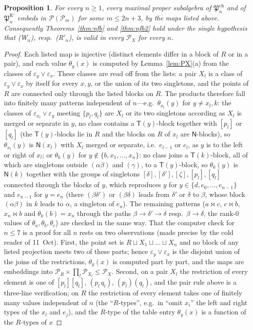 \documentclass[11pt]{amsart}
\newtheorem{proposition}[theorem]{Proposition}
\theoremstyle{definition}
\renewcommand{\P}{\mathcal{P}}
\newcommand{\T}{\mathsf{T}}
\newcommand{\N}{\mathsf{N}}
\newcommand{\mt}{\bowtie}   %
\begin{document}
\begin{proposition}\label{prop:maxsub}
For every $n\ge1$, every maximal proper subalgebra of $\mathfrak P^{\mathrm{ch}}_n$ and of $\mathfrak P^{\mathrm R'}_n$ embeds in $\P(\P_m)$ for some $m\le2n+3$, by the maps listed above. Consequently Theorems~\ref{thm:nfb} and \ref{thm:nfb2} hold under the single hypothesis that \textup{(W$_n$)}, resp.\ \textup{(R$'_n$)}, is valid in every $\P_X$ for every $n$.
\end{proposition}

\begin{proof}
Each listed map is injective (distinct elements differ in a block of $R$ or in a pair), and each value $\theta_y(x)$ is computed by Lemma~\ref{lem:PX}(a) from the classes of $\varepsilon_y\vee\varepsilon_x$. These classes are read off from the lists: a pair $X_l$ is a class of $\varepsilon_y\vee\varepsilon_x$ by itself for every $x,y$, or the union of its two singletons, and the points of $R$ are connected only through the listed blocks on $R$. The products therefore fall into finitely many patterns independent of $n$---e.g.\ $\theta_{x_l}(y)$ for $y\ne x_l,k$: the classes of $\varepsilon_{x_l}\vee\varepsilon_y$ meeting $\{p_l,q_l\}$ are $X_l$ or its two singletons according as $X_l$ is merged or separate in $y$, no class contains a $\T(y)$-block together with $[p_l]$ or $[q_l]$ (the $\T(y)$-blocks lie in $R$ and the blocks on $R$ of $x_l$ are $\N$-blocks), so $\theta_{x_l}(y)$ is $\N(x_l)$ with $X_l$ merged or separate, i.e.\ $e_{l-1}$ or $e_l$, as $y$ is to the left or right of $x_l$; or $\theta_k(y)$ for $y\notin\{b,x_1,\dots,x_n\}$: no class joins a $\T(k)$-block, all of which are singletons outside $(\alpha\beta)$ and $(\gamma)$, to a $\T(y)$-block, so $\theta_k(y)$ is $\N(k)$ together with the groups of singletons $[\delta],[\delta'],[\zeta],[p_l],[q_l]$ connected through the blocks of $y$, which reproduces $y$ for $y\in\{d,e_0,\dots,e_{n-1}\}$ and $e_{n-1}$ for $y=e_n$ (there $(\beta\delta')$ or $(\beta\delta)$ leads from $\delta'$ or $\delta$ to $\beta$, whose block $(\alpha\beta)$ in $k$ leads to $\alpha$, a singleton of $e_n$). The remaining patterns ($a\mt c$, $c\mt b$, $x_n\mt b$ and $\theta_k(b)=x_n$ through the paths $\beta\to\delta'\to\delta$ resp.\ $\beta\to\delta$, the rank-$0$ values of $\theta_a,\theta_b,\theta_c$) are checked in the same way. That the computer check for $n\le7$ is a proof for all $n$ rests on two observations (made precise by the cold reader of 11~Oct). First, the point set is $R\sqcup X_1\sqcup\dots\sqcup X_n$ and no block of any listed projection meets two of these parts; hence $\varepsilon_y\vee\varepsilon_x$ is the disjoint union of the joins of the restrictions, $\theta_y(x)$ is computed part by part, and the maps are embeddings into $\P_R\times\prod_l\P_{X_l}\le\P_X$. Second, on a pair $X_l$ the restriction of every element is one of $[p_l][q_l]$, $(p_l\,q_l)$, $(p_l)(q_l)$, and the pair rule above is a three-line verification; on $R$ the restriction of every element takes one of finitely many values independent of $n$ (the ``$R$-types'', e.g.\ in ``omit $x_i$'' the left and right types of the $x_l$ and $e_j$), and the $R$-type of the table entry $\theta_y(x)$ is a function of the $R$-types of $x$ 
\end{proof}
\end{document}
